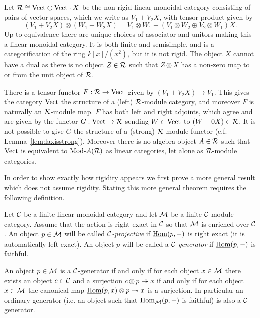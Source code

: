 \documentclass{amsart}
\begin{document}
\begin{example} \label{ex:lax-module}
	Let $\mathcal R \cong \mathrm{Vect} \oplus \mathrm{Vect} \cdot X$ be the non-rigid linear monoidal category consisting of pairs of vector spaces, which we write as $V_1 + V_2 X$, with tensor product given by 
	\begin{equation*}
		(V_1 + V_2 X) \otimes (W_1 + W_2 X) = V_1 \otimes W_1  +  (V_1 \otimes W_2 \oplus V_2 \otimes W_1)X.
	\end{equation*} 
	Up to equivalence there are unique choices of associator and unitors making this a linear monoidal category. 
It is both finite and semisimple, and is a categorification of the ring $k[x]/(x^2)$, but it is not rigid. The object $X$ cannot have a dual as there is no object $Z \in \mathcal R$ such that $Z \otimes X$ has a non-zero map to or from the unit object of $\mathcal R$. 
	
	There is a tensor functor $F:\mathcal R \to \mathrm{Vect}$ given by $(V_1 + V_2 X) \mapsto V_1$. This gives the category $\mathrm{Vect}$ the structure of a (left) $\mathcal R$-module category, and moreover $F$ is naturally an $\mathcal R$-module map. $F$ has both left and right adjoints, which agree and are given by the functor $G: \mathrm{Vect} \to \mathcal R$ sending $W \in \mathrm{Vect}$ to $(W + 0 X) \in \mathcal R$. It is not possible to give $G$ the structure of a (strong) $\mathcal R$-module functor (c.f. Lemma~\ref{lem:laxisstrong}). Moreover there is no algebra object $A \in \mathcal R$ such that $\mathrm{Vect}$ is equivalent to $\Mod{}{A}(\cR)$ as linear categories, let alone as $\mathcal R$-module categories. 
\end{example}

In order to show exactly how rigidity appears we first prove a more general result which does not assume rigidity.  Stating this more general theorem requires the following definition.

\begin{definition}
	Let $\mathcal C$ be a finite linear monoidal category and let $\mathcal M$ be a finite $\mathcal C$-module category. Assume that the action is right exact in $\mathcal C$ so that $\mathcal M$ is enriched over $\mathcal C$. 
	An object $p \in \mathcal M$ will be called {\em $\mathcal C$-projective} if $\operatorname{\underline{Hom}}(p, -)$ is right exact (it is automatically left exact). An object $p$ will be called a {\em $\mathcal C$-generator} if $\operatorname{\underline{Hom}}(p,-)$ is faithful.
\end{definition}

\begin{remark}
	An object $p \in \mathcal M$ is a $\mathcal C$-generator if and only if for each object $x \in \mathcal M$ there exists an object $c \in \mathcal C$ and a surjection $c \otimes p \twoheadrightarrow x$ if and only if for each object $x \in \mathcal M$ the canonical map $\operatorname{\underline{Hom}}(p,x) \otimes p \twoheadrightarrow x$ is a surjection. In particular an ordinary generator (i.e. an object such that $\operatorname{Hom}_\mathcal M(p,-)$ is faithful) is also a $\mathcal C$-generator. 
\end{remark}
\end{document}
